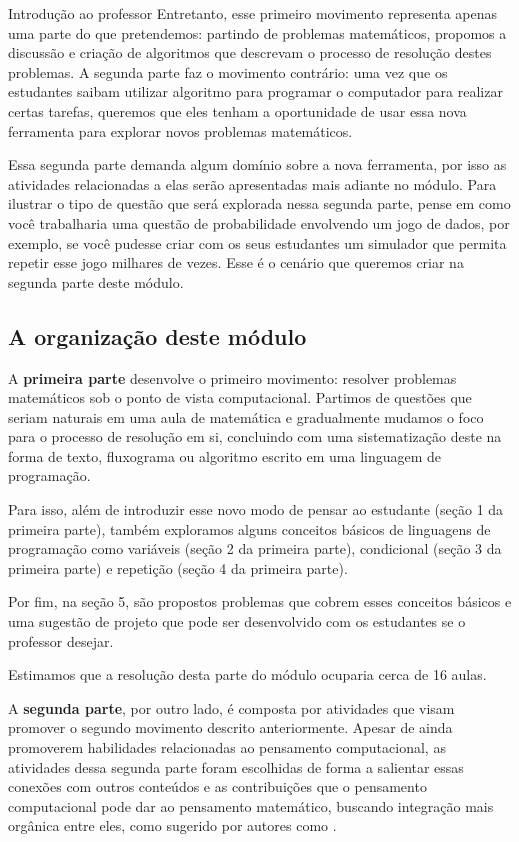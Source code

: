 \begin{apresentacao}{Introdução ao professor}
Entretanto, esse primeiro movimento representa apenas uma parte do que pretendemos: partindo de problemas matemáticos, propomos a discussão e criação de algoritmos que descrevam o processo de resolução destes problemas. A segunda parte faz o movimento contrário: uma vez que os estudantes saibam utilizar algoritmo para programar o computador para realizar certas tarefas, queremos que eles tenham a oportunidade de usar essa nova ferramenta para explorar novos problemas matemáticos.

Essa segunda parte demanda algum domínio sobre a nova ferramenta, por isso as atividades relacionadas a elas serão apresentadas mais adiante no módulo. Para ilustrar o tipo de questão que será explorada nessa segunda parte, pense em como você trabalharia uma questão de probabilidade envolvendo um jogo de dados, por exemplo, se você pudesse criar com os seus estudantes um simulador que permita repetir esse jogo milhares de vezes. Esse é o cenário que queremos criar na segunda parte deste módulo.

\subsection{A organização deste módulo}

A \textbf{primeira parte} desenvolve o primeiro movimento: resolver problemas matemáticos sob o ponto de vista computacional. Partimos de questões que seriam naturais em uma aula de matemática e gradualmente mudamos o foco para o processo de resolução em si, concluindo com uma sistematização deste na forma de texto, fluxograma ou algoritmo escrito em uma linguagem de programação.

Para isso, além de introduzir esse novo modo de pensar ao estudante (seção 1 da primeira parte), também exploramos alguns conceitos básicos de linguagens de programação como variáveis (seção 2 da primeira parte), condicional (seção 3 da primeira parte) e repetição (seção 4 da primeira parte).

Por fim, na seção 5, são propostos problemas que cobrem esses conceitos básicos e uma sugestão de projeto que pode ser desenvolvido com os estudantes se o professor desejar.

Estimamos que a resolução desta parte do módulo ocuparia cerca de 16 aulas.

A \textbf{segunda parte}, por outro lado, é composta por atividades que visam promover o segundo movimento descrito anteriormente. Apesar de ainda promoverem habilidades relacionadas ao pensamento computacional, as atividades dessa segunda parte foram escolhidas de forma a salientar essas conexões com outros conteúdos e as contribuições que o pensamento computacional pode dar ao pensamento matemático, buscando integração mais orgânica entre eles, como sugerido por autores como \citet{disessa2018}.


\end{apresentacao}
